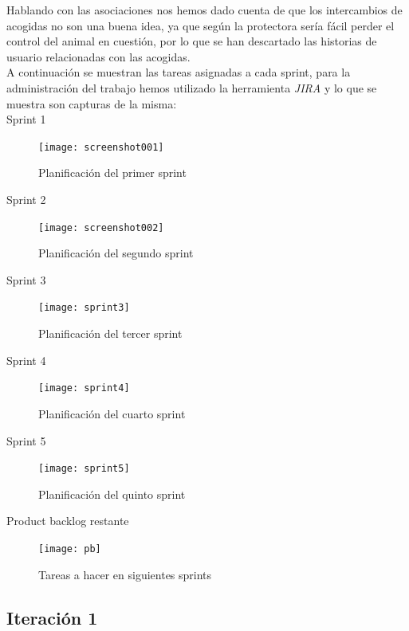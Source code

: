 Hablando con las asociaciones nos hemos dado cuenta de que los intercambios de acogidas no son una buena idea, ya que según la protectora sería fácil perder el control del animal en cuestión, por lo que se han descartado las historias de usuario relacionadas con las acogidas. \\

A continuación se muestran las tareas asignadas a cada sprint, para la administración del trabajo hemos utilizado la herramienta \textit{JIRA} y lo que se muestra son capturas de la misma: \\

Sprint 1 \\ 
\begin{figure}[H]
	\centering
	\texttt{[image: screenshot001]}
	\caption{Planificación del primer sprint}
	\label{fig:sprint1}
\end{figure}


Sprint 2 \\
\begin{figure}[H]
	\centering
	\texttt{[image: screenshot002]}
	\caption{Planificación del segundo sprint}
	\label{fig:sprint2}
\end{figure} 


Sprint 3 \\ 
\begin{figure}[H]
	\centering
	\texttt{[image: sprint3]}
	\caption{Planificación del tercer sprint}
	\label{fig:sprint3}
\end{figure}

Sprint 4 \\
\begin{figure}[H]
	\centering
	\texttt{[image: sprint4]}
	\caption{Planificación del cuarto sprint}
	\label{fig:sprint4}
\end{figure}

Sprint 5 \\ 
\begin{figure}[H]
	\centering
	\texttt{[image: sprint5]}
	\caption{Planificación del quinto sprint}
	\label{fig:sprint5}
\end{figure}

Product backlog restante \\
\begin{figure}[H]
	\centering
	\texttt{[image: pb]}
	\caption{Tareas a hacer en siguientes sprints}
	\label{fig:pb_restante}
\end{figure}





\subsection{Iteración 1}

